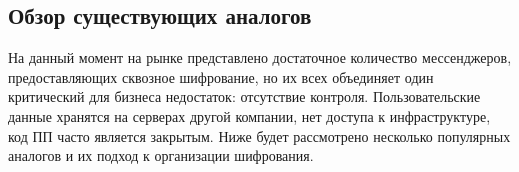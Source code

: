 \subsection{Обзор существующих аналогов}
\label{sec:analysis:research:analogs}

На данный момент на рынке представлено достаточное количество мессенджеров, предоставляющих сквозное шифрование, но их всех объединяет один критический для бизнеса недостаток: отсутствие контроля. 
Пользовательские данные хранятся на серверах другой компании, нет доступа к инфраструктуре, код ПП часто является закрытым. Ниже будет рассмотрено несколько популярных аналогов и их подход к организации шифрования.


